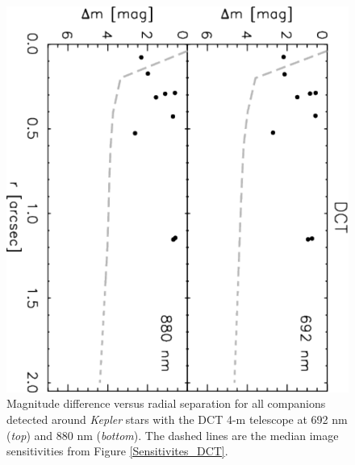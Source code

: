 \documentclass[twocolumn,appendixfloats]{aastex6}
\begin{document}
\begin{figure}[!]
\centering
\includegraphics[angle=90, scale=0.53]{DCT_speckle_multiples.pdf}
\caption{Magnitude difference versus radial separation for all companions detected
around {\it Kepler} stars with the DCT 4-m telescope at 692 nm ({\it top}) and 
880 nm ({\it bottom}). The dashed lines are the median image sensitivities from 
Figure \ref {Sensitivites_DCT}.
\label{KOIs_DCT}}
\end{figure}
\end{document}
